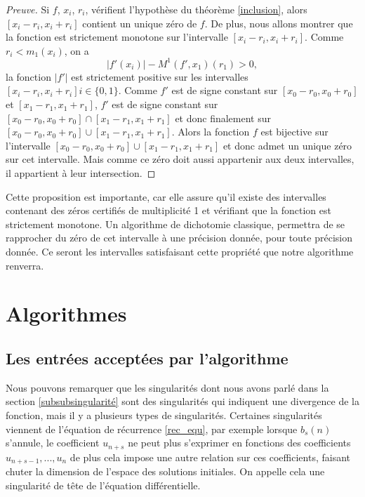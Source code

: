 \documentclass[a4paper,10pt]{article}
\begin{document}
	\begin{proof}[Preuve]
		Si $f$, $x_i$, $r_i$, vérifient l'hypothèse du théorème \ref{inclusion}, alors  $[x_i-r_i,x_i+r_i]$ contient un unique zéro de $f$.
		De plus, nous allons montrer que la fonction est strictement monotone sur l'intervalle $[x_i-r_i,x_i+r_i]$. Comme $r_i<m_1(x_i)$, on a 
		\[|f'(x_i)|-M^1(f',x_1)(r_1)>0,\]
		la fonction $|f'|$ est strictement positive sur les intervalles $[x_i-r_i,x_i+r_i] i \in \{0,1\}$.
		Comme $f'$  est de signe constant sur $[x_0-r_0,x_0+r_0]$ et $[x_1-r_1,x_1+r_1]$, $f'$ est de signe constant sur $[x_0-r_0,x_0+r_0] \cap [x_1-r_1,x_1+r_1]$ et donc finalement sur $[x_0-r_0,x_0+r_0] \cup [x_1-r_1,x_1+r_1]$. Alors la fonction $f$ est bijective sur l'intervalle $[x_0-r_0,x_0+r_0] \cup [x_1-r_1,x_1+r_1]$ et donc admet un unique zéro sur cet intervalle. Mais comme ce zéro doit aussi appartenir aux deux intervalles, il appartient à leur intersection.
	\end{proof}
	Cette proposition est importante, car elle assure qu'il existe des intervalles contenant des zéros certifiés de multiplicité 1 et vérifiant que la fonction est strictement monotone. Un algorithme de dichotomie classique, permettra de se rapprocher du zéro de cet intervalle à une précision donnée, pour toute précision donnée. Ce seront les intervalles satisfaisant cette propriété que notre algorithme renverra.
	
	
	

	\section{Algorithmes}
	\label{sec:algorithme}
	\subsection{Les entrées acceptées par l'algorithme}
	
	
	Nous pouvons remarquer que les singularités dont nous avons parlé dans la  section \ref{subsubsingularité}  sont des singularités qui indiquent une divergence de la fonction, mais il y a plusieurs types  de singularités. Certaines singularités viennent de l'équation de récurrence \eqref{rec_equ}, par exemple lorsque $b_s(n)$ s'annule, le coefficient $u_{n+s}$ ne peut plus s'exprimer en fonctions des coefficients $u_{n+s-1},...,u_n$ de plus cela impose une autre relation sur ces coefficients, faisant chuter la dimension de l'espace des solutions initiales. On appelle cela une singularité de tête de l'équation différentielle. 
	
\end{document}
